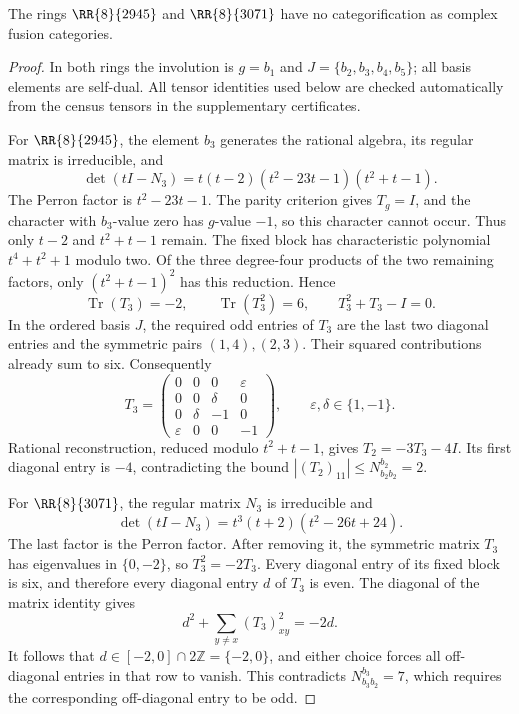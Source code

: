 \begin{proposition}\label{prop:two-four-fixed-exclusions}
The rings $\RR{8}{2945}$ and $\RR{8}{3071}$ have no categorification
as complex fusion categories.
\end{proposition}
\begin{proof}
In both rings the involution is $g=b_1$ and
$J=\{b_2,b_3,b_4,b_5\}$; all basis elements are self-dual.
All tensor identities used below are checked automatically from the
census tensors in the supplementary certificates.

For $\RR{8}{2945}$, the element $b_3$ generates the rational algebra,
its regular matrix is irreducible, and
\[
 \det(tI-N_3)=t(t-2)(t^2-23t-1)(t^2+t-1).
\]
The Perron factor is $t^2-23t-1$. The parity criterion gives $T_g=I$,
and the character with $b_3$-value zero has $g$-value $-1$, so this
character cannot occur. Thus only $t-2$ and $t^2+t-1$ remain.
The fixed block has characteristic polynomial
$t^4+t^2+1$ modulo two. Of the three degree-four products of the two
remaining factors, only $(t^2+t-1)^2$ has this reduction. Hence
\[
 \operatorname{Tr}(T_3)=-2,\qquad
 \operatorname{Tr}(T_3^2)=6,\qquad T_3^2+T_3-I=0.
\]
In the ordered basis $J$, the required odd entries of $T_3$ are the
last two diagonal entries and the symmetric pairs $(1,4),(2,3)$.
Their squared contributions already sum to six. Consequently
\[
 T_3=\begin{pmatrix}
 0&0&0&\varepsilon\\
 0&0&\delta&0\\
 0&\delta&-1&0\\
 \varepsilon&0&0&-1
 \end{pmatrix},\qquad \varepsilon,\delta\in\{1,-1\}.
\]
Rational reconstruction, reduced modulo $t^2+t-1$, gives
$T_2=-3T_3-4I$. Its first diagonal entry is $-4$, contradicting the
bound $|(T_2)_{11}|\leq N_{b_2b_2}^{b_2}=2$.

For $\RR{8}{3071}$, the regular matrix $N_3$ is irreducible and
\[
 \det(tI-N_3)=t^3(t+2)(t^2-26t+24).
\]
The last factor is the Perron factor. After removing it, the symmetric
matrix $T_3$ has eigenvalues in $\{0,-2\}$, so $T_3^2=-2T_3$.
Every diagonal entry of its fixed block is six, and therefore every
diagonal entry $d$ of $T_3$ is even. The diagonal of the matrix identity
gives
\[
 d^2+\sum_{y\ne x}(T_3)_{xy}^2=-2d.
\]
It follows that $d\in[-2,0]\cap2\mathbb Z=\{-2,0\}$, and either
choice forces all off-diagonal entries in that row to vanish. This
contradicts $N_{b_3b_2}^{b_3}=7$, which requires the corresponding
off-diagonal entry to be odd.
\end{proof}

